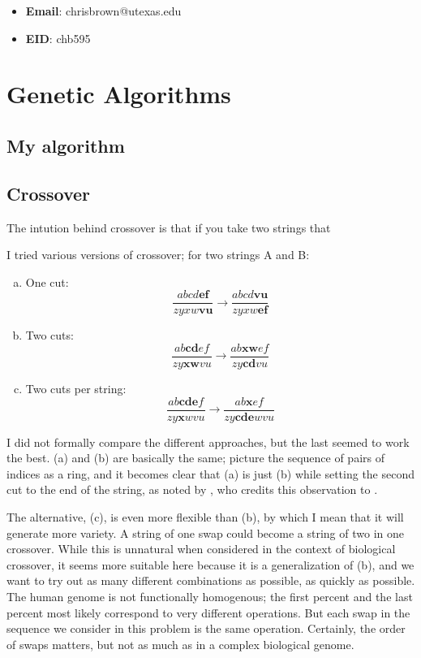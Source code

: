 \documentclass[11pt]{report}
\begin{document}
\begin{itemize}
  \item \textbf{Email}: chrisbrown@utexas.edu
  \item \textbf{EID}: chb595
\end{itemize}

\section{Genetic Algorithms}

\subsection{My algorithm}




\subsection{Crossover}
The intution behind crossover is that if you take two strings that 

I tried various versions of crossover; for two strings A and B:
\begin{enumerate}[a.]
  \item One cut:
    \[
      \frac{abcd\mathbf{ef}}{zyxw\mathbf{vu}} \to \frac{abcd\mathbf{vu}}{zyxw\mathbf{ef}}
    \]
  \item Two cuts:
    \[
      \frac{ab\mathbf{cd}ef}{zy\mathbf{xw}vu} \to \frac{ab\mathbf{xw}ef}{zy\mathbf{cd}vu}
    \]
  \item Two cuts per string:
    \[
      \frac{ab\mathbf{cde}f}{zy\mathbf{x}wvu} \to \frac{ab\mathbf{x}ef}{zy\mathbf{cde}wvu}
    \]
\end{enumerate}
I did not formally compare the different approaches, but the last seemed to work the best. (a) and (b) are basically the same; picture the sequence of pairs of indices as a ring, and it becomes clear that (a) is just (b) while setting the second cut to the end of the string, as noted by \citet{whitley:1993}, who credits this observation to \citet{dejong:1975}.

The alternative, (c), is even more flexible than (b), by which I mean that it will generate more variety. A string of one swap could become a string of two in one crossover. While this is unnatural when considered in the context of biological crossover, it seems more suitable here because it is a generalization of (b), and we want to try out as many different combinations as possible, as quickly as possible. The human genome is not functionally homogenous; the first percent and the last percent most likely correspond to very different operations. But each swap in the sequence we consider in this problem is the same operation. Certainly, the order of swaps matters, but not as much as in a complex biological genome.
\end{document}

